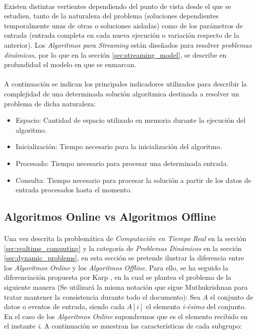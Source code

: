 \documentclass{subfiles}
\begin{document}
        \paragraph{}
        Existen distintas vertientes dependiendo del punto de vista desde el que se estudien, tanto de la naturaleza del problema (soluciones dependientes temporalmente unas de otras o soluciones aisladas) como de los parámetros de entrada (entrada completa en cada nueva ejecución o variación respecto de la anterior). Los \emph{Algoritmos para Streaming} están diseñados para resolver \emph{problemas dinámicos}, por lo que en la sección \ref{sec:streaming_model}, se describe en profundidad el modelo en que se enmarcan.

        \paragraph{}
        A continuación se indican los principales indicadores utilizados para describir la complejidad de una determinada solución algorítmica destinada a resolver un problema de dicha naturaleza:

        \begin{itemize}
          \item Espacio: Cantidad de espacio utilizado en memoria durante la ejecución del algoritmo.
          \item Inicialización: Tiempo necesario para la inicialización del algoritmo.
          \item Procesado: Tiempo necesario para procesar una determinada entrada.
          \item Consulta: Tiempo necesario para procesar la solución a partir de los datos de entrada procesados hasta el momento.
        \end{itemize}


      \subsection{Algoritmos Online vs Algoritmos Offline}

        \paragraph{}
        Una vez descrita la problemática de \emph{Computación en Tiempo Real} en la sección \ref{sec:realtime_computing} y la categoría de \emph{Problemas Dinámicos} en la sección \ref{sec:dynamic_problems}, en esta sección se pretende ilustrar la diferencia entre los \emph{Algoritmos Online} y los \emph{Algoritmos Offline}. Para ello, se ha seguido la diferenciación propuesta por Karp \cite{Karp:1992:OAV:645569.659725}, en la cual se plantea el problema de la siguiente manera (Se utilizará la misma notación que sigue Muthukrishnan\cite{Muthukrishnan:2005:DSA:1166409.1166410} para tratar mantener la consistencia durante todo el documento): Sea $A$ el conjunto de datos o eventos de entrada, siendo cada $A[i]$ el elemento \emph{i-ésimo} del conjunto. En el caso de los \emph{Algoritmos Online} supondremos que es el elemento recibido en el instante \emph{i}. A continuación se muestran las características de cada subgrupo:
\end{document}
